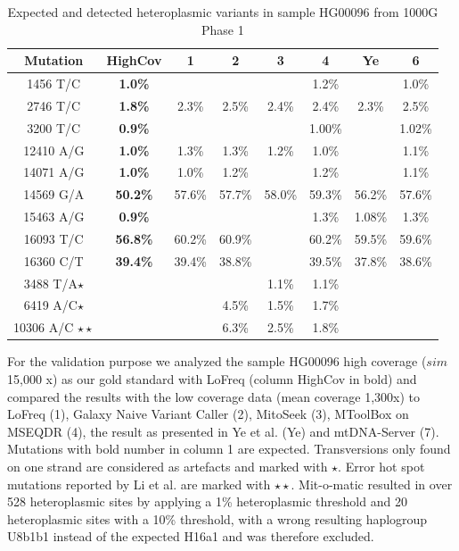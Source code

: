 \begin{table}[h]
\centering
\caption{Expected and detected heteroplasmic variants in sample HG00096 from 1000G Phase 1}
\label{table:hg00096}
\begin{tabular}{c|c|cccccc}
\hline
Mutation & HighCov & 1 & 2 & 3 & 4 & Ye & 6 \\
\hline
1456 T/C & \textbf{1.0\%} & & & & 1.2\% & & 1.0\%\\
2746 T/C & \textbf{1.8\%} & 2.3\% & 2.5\% &2.4\% & 2.4\% & 2.3\% & 2.5\%\\
3200 T/C &\textbf{0.9\%} & & & & 1.00\% & & 1.02\%\\
12410 A/G & \textbf{1.0\%} & 1.3\% &1.3\%  & 1.2\% & 1.0\% & & 1.1\%\\
14071 A/G &\textbf{1.0\%} & 1.0\% & 1.2\% & & 1.2\%& & 1.1\%\\
14569 G/A &\textbf{50.2\%} & 57.6\% & 57.7\% & 58.0\% & 59.3\% &56.2\%& 57.6\% \\
15463 A/G & \textbf{0.9\%} & & & & 1.3\% & 1.08\% &1.3\%\\
16093 T/C& \textbf{56.8\%} & 60.2\% & 60.9\% & & 60.2\% & 59.5\% &59.6\% \\
16360 C/T &\textbf{39.4\%} & 39.4\% & 38.8\%& &  39.5\% & 37.8\% &38.6\% \\
3488 T/A$\star$ & & & & 1.1\% & 1.1\% &  \\
6419 A/C$\star$  & &  & 4.5\% & 1.5\%& 1.7\% \\
10306 A/C $\star \star$& & & 6.3\% & 2.5\% & 1.8\% &  \\

\end{tabular}
\end{table}
For the validation purpose we analyzed the sample HG00096 high coverage ($sim$ 15,000 x) as our gold standard with LoFreq (column HighCov in bold) and compared the results with the low coverage data (mean coverage 1,300x) to LoFreq (1), Galaxy Naive Variant Caller (2), MitoSeek (3), MToolBox on MSEQDR (4), the result as presented in Ye et al. \cite{Ye2014}(Ye) and mtDNA-Server (7).  Mutations with bold number in column 1 are expected. 
Transversions only found on one strand are considered as artefacts and marked with $\star$. Error hot spot
mutations reported by Li et al. \cite{Li2010} are marked with $\star \star$. Mit-o-matic resulted in over 528 heteroplasmic sites by applying a 1\% heteroplasmic threshold and  20 heteroplasmic sites with a 10\% threshold, with a wrong resulting haplogroup U8b1b1 instead of the expected H16a1 and was therefore excluded.\\

